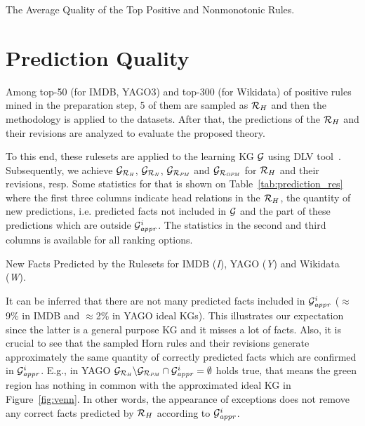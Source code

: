 \begin{table}[ht]
\centering
\footnotesize
\renewcommand*{\arraystretch}{1.07}
\centering

\smallskip
\caption{The Average Quality of the Top Positive and Nonmonotonic Rules.}
\label{tab:rules_quality}
\end{table}

\section{Prediction Quality}

Among top-50 (for IMDB, YAGO3) and top-300 (for Wikidata) of positive rules mined in the preparation step, 5 of them are sampled as $\mathcal{R}_H$ and then the methodology is applied to the datasets. After that, the predictions of the $\mathcal{R}_H$ and their revisions are analyzed to evaluate the proposed theory.

To this end, these rulesets are applied to the learning KG $\mathcal{G}$ using DLV tool~\cite{dlv}. Subsequently, we achieve $\mathcal{G}_{\mathcal{R}_{\mathit{H}}}$, $\mathcal{G}_{\mathcal{R}_{\mathit{N}}}$, $\mathcal{G}_{\mathcal{R}_{\mathit{PM}}}$ and $\mathcal{G}_{\mathcal{R}_{\mathit{OPM}}}$ for $\mathcal{R}_H$ and their revisions, resp. Some statistics for that is shown on Table~\ref{tab:prediction_res} where the first three columns indicate head relations in the $\mathcal{R}_H$, the
quantity of new predictions, i.e. predicted facts not included in $\mathcal{G}$ and the part of these predictions which are outside $\mathcal{G}^i_{\mathit{appr}}$. The statistics in the second and third columns is available for all ranking options.

\begin{table}[ht]
\centering

\smallskip
\caption{New Facts Predicted by the Rulesets for IMDB (\textit{I}), YAGO (\textit{Y}) and Wikidata (\textit{W}).}
\label{tab:prediction_res}
\end{table}

It can be inferred that there are not many predicted facts included in $\mathcal{G}^i_{\mathit{appr}}$ ($\approx$9\% in IMDB and $\approx$2\% in YAGO ideal KGs). This illustrates our expectation since the latter is a general purpose KG and it misses a lot of facts. Also, it is crucial to see that the sampled Horn rules and their revisions generate approximately the same quantity of correctly predicted facts which are confirmed in $\mathcal{G}^i_{\mathit{appr}}$. E.g., in YAGO $\mathcal{G}_{\mathit{\mathcal{R}_H}}\backslash \mathcal{G}_{\mathit{\mathcal{R}_{PM}}} \cap \mathcal{G}^i_{\mathit{appr}}=\emptyset$ holds true, that means the green region has nothing in common with the approximated ideal KG in Figure~\ref{fig:venn}. In other words, the appearance of exceptions does not remove any correct facts predicted by $\mathcal{R}_H$ according to $\mathcal{G}^i_{\mathit{appr}}$.


